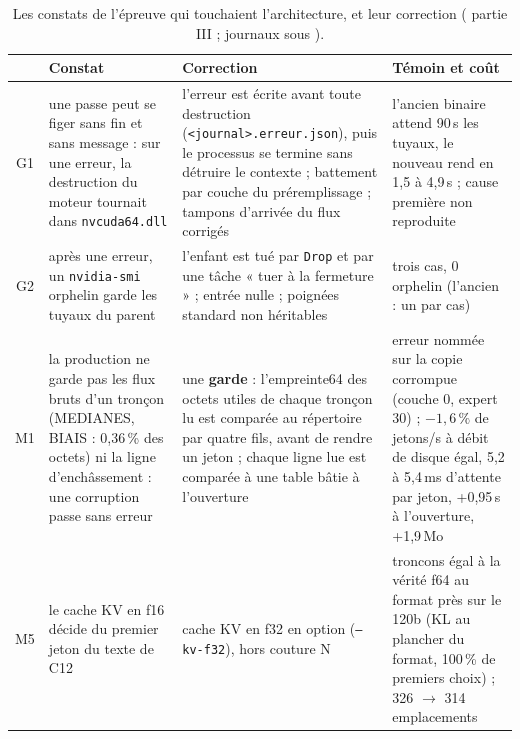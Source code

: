\begin{table}[ht]
\centering\small
\begin{tabularx}{\linewidth}{c >{\raggedright\arraybackslash}X >{\raggedright\arraybackslash}X >{\raggedright\arraybackslash}X}
\toprule
& Constat & Correction & Témoin et coût \\
\midrule
G1 & une passe peut se figer sans fin et sans message : sur une erreur, la destruction du moteur tournait dans \texttt{nvcuda64.dll} & l'erreur est écrite avant toute destruction (\texttt{<journal>.erreur.json}), puis le processus se termine sans détruire le contexte ; battement par couche du préremplissage ; tampons d'arrivée du flux corrigés & l'ancien binaire attend 90\,s les tuyaux, le nouveau rend en 1,5 à 4,9\,s ; cause première non reproduite \\
G2 & après une erreur, un \texttt{nvidia-smi} orphelin garde les tuyaux du parent & l'enfant est tué par \texttt{Drop} et par une tâche « tuer à la fermeture » ; entrée nulle ; poignées standard non héritables & trois cas, 0 orphelin (l'ancien : un par cas) \\
M1 & la production ne garde pas les flux bruts d'un tronçon (MEDIANES, BIAIS : 0,36\,\% des octets) ni la ligne d'enchâssement : une corruption passe sans erreur & une \textbf{garde} : l'empreinte64 des octets utiles de chaque tronçon lu est comparée au répertoire par quatre fils, avant de rendre un jeton ; chaque ligne lue est comparée à une table bâtie à l'ouverture & erreur nommée sur la copie corrompue (couche 0, expert 30) ; $-1{,}6\,\%$ de jetons/s à débit de disque égal, 5,2 à 5,4\,ms d'attente par jeton, +0,95\,s à l'ouverture, +1,9\,Mo \\
M5 & le cache KV en f16 décide du premier jeton du texte de C12 & cache KV en f32 en option (\texttt{--kv-f32}), hors couture N & troncons égal à la vérité f64 au format près sur le 120b (KL au plancher du format, 100\,\% de premiers choix) ; 326 $\to$ 314 emplacements \\
\bottomrule
\end{tabularx}
\caption[Ce que la ronde de corrections a changé]{Les constats de l'épreuve qui touchaient l'architecture, et leur correction ( partie III ; journaux sous ).}
\label{t2arch:tab:ronde}
\end{table}

